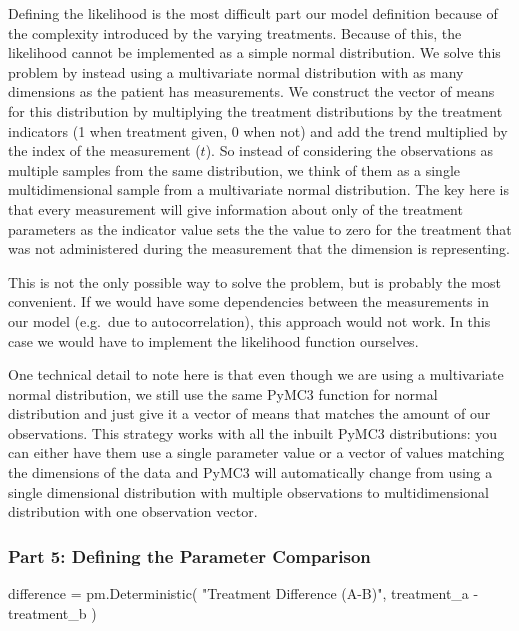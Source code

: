 \documentclass[12pt,a4paper,leqno]{report}
\theoremstyle{plain}
\theoremstyle{definition}
\theoremstyle{remark}
\begin{document}
Defining the likelihood is the most difficult part our model definition because of the
complexity introduced by the varying treatments. Because of this, the likelihood cannot
be implemented as a simple normal distribution. We solve this problem by instead using a
multivariate normal distribution with as many dimensions as the patient has
measurements. We construct the vector of means for this distribution by multiplying the
treatment distributions by the treatment indicators (1 when
treatment given, 0 when not) and add the trend multiplied by the index of the
measurement (\(t\)). So instead of considering
the observations as multiple samples from the same distribution, we think of them as a
single multidimensional sample from
a multivariate normal distribution. The key here is that every measurement will give
information about only of the treatment parameters as the indicator value sets the
the value to zero for the treatment that was not administered during the
measurement that the dimension is representing.

This is not the only possible way to solve the
problem, but is probably the most convenient. If we would have some
dependencies between the measurements in our model (e.g.\ due to autocorrelation), this approach
would not work. In this case we would have to implement the likelihood function
ourselves.

One technical detail to note here is that even though we are using a multivariate normal
distribution, we still use the same PyMC3 function for normal distribution and just give
it a vector of means that matches the amount of our observations. This strategy works
with all the inbuilt PyMC3 distributions: you can either have them use a single
parameter value or a vector of values matching the dimensions of the data and PyMC3 will automatically
change from using a single dimensional distribution with multiple observations to
multidimensional distribution with one observation vector.

\subsubsection*{Part 5: Defining the Parameter Comparison}

\bigskip
\begin{pyverbatim}[][fontsize=\footnotesize]
    difference = pm.Deterministic(
        "Treatment Difference (A-B)", treatment_a - treatment_b
    )
\end{pyverbatim}
\smallskip
\end{document}
